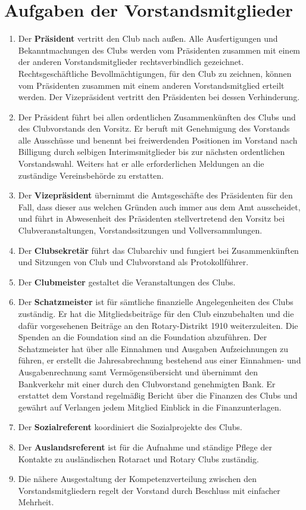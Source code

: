 \documentclass{article}
\begin{document}
\section{Aufgaben der Vorstandsmitglieder}
\begin{enumerate}
    \item Der \textbf{Präsident} vertritt den Club nach außen. Alle Ausfertigungen und Bekanntmachungen des Clubs werden vom Präsidenten zusammen mit einem der anderen Vorstandsmitglieder rechtsverbindlich gezeichnet. Rechtsgeschäftliche Bevollmächtigungen, für den Club zu zeichnen, können vom Präsidenten zusammen mit einem anderen Vorstandsmitglied erteilt werden. Der Vizepräsident vertritt den Präsidenten bei dessen Verhinderung.
    \item Der Präsident führt bei allen ordentlichen Zusammenkünften des Clubs und des Clubvorstands den Vorsitz. Er beruft mit Genehmigung des Vorstands alle Ausschüsse und benennt bei freiwerdenden Positionen im Vorstand nach Billigung durch selbigen Interimsmitglieder bis zur nächsten ordentlichen Vorstandswahl. Weiters hat er alle erforderlichen Meldungen an die zuständige Vereinsbehörde zu erstatten.
    \item Der \textbf{Vizepräsident} übernimmt die Amtsgeschäfte des Präsidenten für den Fall, dass dieser aus welchen Gründen auch immer aus dem Amt ausscheidet, und führt in Abwesenheit des Präsidenten stellvertretend den Vorsitz bei Clubveranstaltungen, Vorstandssitzungen und Vollversammlungen.
    \item Der \textbf{Clubsekretär} führt das Clubarchiv und fungiert bei Zusammenkünften und Sitzungen von Club und Clubvorstand als Protokollführer.
    \item Der \textbf{Clubmeister} gestaltet die Veranstaltungen des Clubs.
    \item Der \textbf{Schatzmeister} ist für sämtliche finanzielle Angelegenheiten des Clubs zuständig. Er hat die Mitgliedsbeiträge für den Club einzubehalten und die dafür vorgesehenen Beiträge an den Rotary-Distrikt 1910 weiterzuleiten. Die Spenden an die Foundation sind an die Foundation abzuführen. Der Schatzmeister hat über alle Einnahmen und Ausgaben Aufzeichnungen zu führen, er erstellt die Jahresabrechnung bestehend aus einer Einnahmen- und Ausgabenrechnung samt Vermögensübersicht und übernimmt den Bankverkehr mit einer durch den Clubvorstand genehmigten Bank. Er erstattet dem Vorstand regelmäßig Bericht über die Finanzen des Clubs und gewährt auf Verlangen jedem Mitglied Einblick in die Finanzunterlagen.
    \item Der \textbf{Sozialreferent} koordiniert die Sozialprojekte des Clubs.
    \item Der \textbf{Auslandsreferent} ist für die Aufnahme und ständige Pflege der Kontakte zu ausländischen Rotaract und Rotary Clubs zuständig.
    \item Die nähere Ausgestaltung der Kompetenzverteilung zwischen den Vorstandsmitgliedern regelt der Vorstand durch Beschluss mit einfacher Mehrheit.
\end{enumerate}
\end{document}
